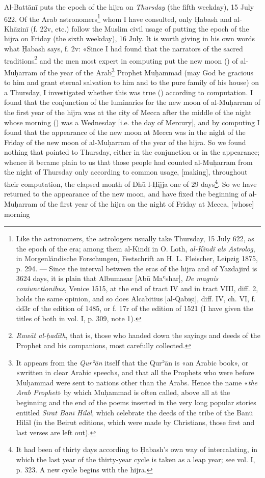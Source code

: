 \documentclass[11pt]{article}
\newcommand{\Pg}[1]{\marginpar{\footnotesize\color{gray}#1}}
\begin{document}
\par \Pg{II 200}Al-Battānī puts the epoch of the hijra on \emph{Thursday} (the fifth weekday), 15 July 622. Of the Arab astronomers\footnote{Like the astronomers, the astrologers usually take Thursday, 15 July 622, as the epoch of the era; among them al-Kindī in O. Loth, \emph{al-Kindî als Astrolog}, in Morgenländische Forschungen, Festschrift an H. L. Fleischer, Leipzig 1875, p. 294. — Since the interval between the eras of the hijra and of Yazdajird is 3624 days, it is plain that Albumasar [Abū Maʿshar], \emph{De magnis coniunctionibus}, Venice 1515, at the end of tract IV and in tract VIII, diff. 2, holds the same opinion, and so does Alcabitius [al-Qabīṣī], diff. IV, ch. VI, f. dd3r of the edition of 1485, or f. 17r of the edition of 1521 (I have given the titles of both in vol. I, p. 309, note 1).} whom I have consulted, only Ḥabash and al-Khāzinī (f. 22v, etc.) follow the Muslim civil usage of putting the epoch of the hijra on Friday (the sixth weekday), 16 July. It is worth giving in his own words what Ḥabash says, f. 2v: «Since I had found that the narrators of the sacred traditions\footnote{\emph{Ruwāt al-ḥadīth}, that is, those who handed down the sayings and deeds of the Prophet and his companions, most carefully collected.} and the men most expert in computing put the new moon () of al-Muḥarram of the year of the Arab\footnote{It appears from the \emph{Qurʾān} itself that the Qurʾān is «an Arabic book», or «written in clear Arabic speech», and that all the Prophets who were before Muḥammad were sent to nations other than the Arabs. Hence the name «\emph{the Arab Prophet}» by which Muḥammad is often called, above all at the beginning and the end of the poems inserted in the very long popular stories entitled \emph{Sīrat Banī Hilāl}, which celebrate the deeds of the tribe of the Banū Hilāl (in the Beirut editions, which were made by Christians, those first and last verses are left out).} Prophet Muḥammad (may God be gracious to him and grant eternal salvation to him and to the pure family of his house) on a Thursday, I investigated whether this was true () according to computation. I found that the conjunction of the luminaries for the new moon of al-Muḥarram of the first year of the hijra was at the city of Mecca after the middle of the night whose morning () was a Wednesday [i.e. the day of Mercury], and by computing I found that the appearance of the new moon at Mecca was in the night of the Friday of the new moon of al-Muḥarram of the year of the hijra. So we found nothing that pointed to Thursday, either in the conjunction or in the appearance; whence it became plain to us that those people had counted al-Muḥarram from the night of Thursday only according to common usage, [making], throughout their computation, the elapsed month of Dhū l-Ḥijja one of 29 days\footnote{It had been of thirty days according to Ḥabash's own way of intercalating, in which the last year of the thirty-year cycle is taken as a leap year; see vol. I, p. 323. A new cycle begins with the hijra.}. So we have returned to the appearance of the new moon, and have fixed the beginning of al-Muḥarram of the first year of the hijra on the night of Friday at Mecca, [whose] morning 
\end{document}
